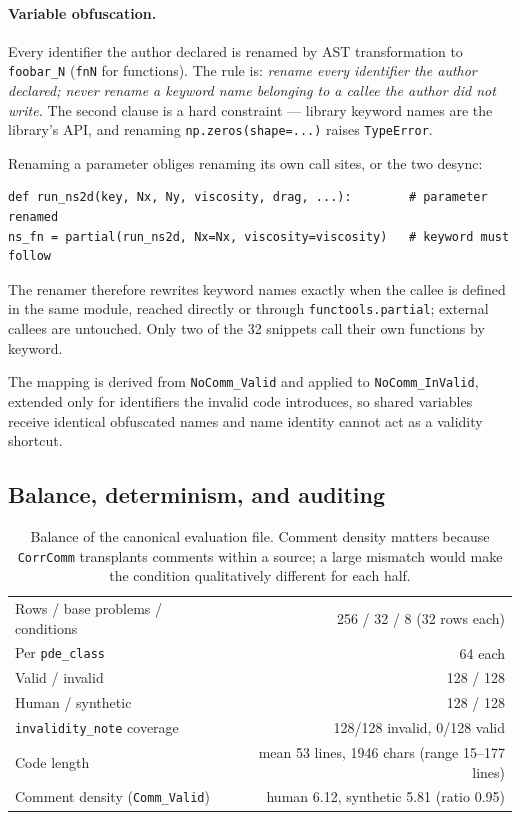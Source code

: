 \documentclass[11pt]{article}
\begin{document}
\paragraph{Variable obfuscation.} Every identifier the author declared is renamed by AST
transformation to \texttt{foobar\_N} (\texttt{fnN} for functions). The rule is: \emph{rename
every identifier the author declared; never rename a keyword name belonging to a callee the
author did not write.} The second clause is a hard constraint --- library keyword names are
the library's API, and renaming \texttt{np.zeros(shape=...)} raises \texttt{TypeError}.

Renaming a parameter obliges renaming its own call sites, or the two desync:

\begin{lstlisting}
def run_ns2d(key, Nx, Ny, viscosity, drag, ...):        # parameter renamed
ns_fn = partial(run_ns2d, Nx=Nx, viscosity=viscosity)   # keyword must follow
\end{lstlisting}

\noindent The renamer therefore rewrites keyword names exactly when the callee is defined in
the same module, reached directly or through \texttt{functools.partial}; external callees are
untouched. Only two of the 32 snippets call their own functions by keyword.

The mapping is derived from \texttt{NoComm\_Valid} and applied to \texttt{NoComm\_InValid},
extended only for identifiers the invalid code introduces, so shared variables receive
identical obfuscated names and name identity cannot act as a validity shortcut.

\subsection{Balance, determinism, and auditing}

\begin{table}[h]
\centering
\small
\begin{tabular}{@{}lr@{}}
\toprule
Rows / base problems / conditions & 256 / 32 / 8 (32 rows each) \\
Per \texttt{pde\_class} & 64 each \\
Valid / invalid & 128 / 128 \\
Human / synthetic & 128 / 128 \\
\texttt{invalidity\_note} coverage & 128/128 invalid, 0/128 valid \\
Code length & mean 53 lines, 1946 chars (range 15--177 lines) \\
Comment density (\texttt{Comm\_Valid}) & human 6.12, synthetic 5.81 (ratio 0.95) \\
\bottomrule
\end{tabular}
\caption{Balance of the canonical evaluation file. Comment density matters because
\texttt{CorrComm} transplants comments within a source; a large mismatch would make the
condition qualitatively different for each half.}
\end{table}
\end{document}
